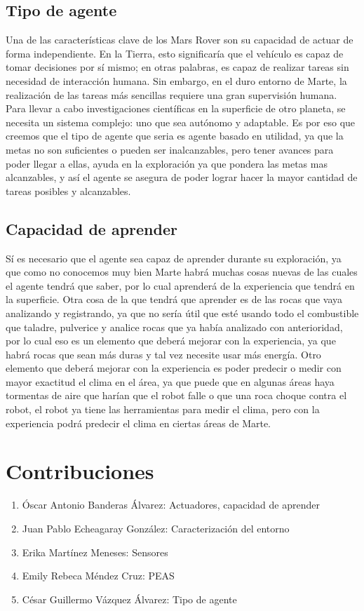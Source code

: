\documentclass{article}
\begin{document}
        \subsection{Tipo de agente}
            Una de las características clave de los Mars Rover son su capacidad de actuar de forma independiente. En la Tierra, esto significaría que el vehículo es capaz de tomar decisiones por sí mismo; en otras palabras, es capaz de realizar tareas sin necesidad de interacción humana. Sin embargo, en el duro entorno de Marte, la realización de las tareas más sencillas requiere una gran supervisión humana. Para llevar a cabo investigaciones científicas en la superficie de otro planeta, se necesita un sistema complejo: uno que sea autónomo y adaptable. Es por eso que creemos que el tipo de agente que seria es agente basado en utilidad, ya que la metas no son suficientes o pueden ser inalcanzables, pero tener avances para poder llegar a ellas, ayuda en la exploración ya que pondera las metas mas alcanzables, y así el agente se asegura de poder lograr hacer la mayor cantidad de tareas posibles y alcanzables.

        \subsection{Capacidad de aprender}
            Sí es necesario que el agente sea capaz de aprender durante su exploración, ya que como no conocemos muy bien Marte habrá muchas cosas nuevas de las cuales el agente tendrá que saber, por lo cual aprenderá de la experiencia que tendrá en la superficie. Otra cosa de la que tendrá que aprender es de las rocas que vaya analizando y registrando, ya que no sería útil que esté usando todo el combustible que taladre, pulverice y analice rocas que ya había analizado con anterioridad, por lo cual eso es un elemento que deberá mejorar con la experiencia, ya que habrá rocas que sean más duras y tal vez necesite usar más energía. Otro elemento que deberá mejorar con la experiencia es poder predecir o medir con mayor exactitud el clima en el área, ya que puede que en algunas áreas haya tormentas de aire que harían que el robot falle o que una roca choque contra el robot, el robot ya tiene las herramientas para medir el clima, pero con la experiencia podrá predecir el clima en ciertas áreas de Marte. 
    \section{Contribuciones}
        \begin{enumerate}
            \item Óscar Antonio Banderas Álvarez: Actuadores, capacidad de aprender
            \item Juan Pablo Echeagaray González: Caracterización del entorno
            \item Erika Martínez Meneses: Sensores
            \item Emily Rebeca Méndez Cruz: PEAS
            \item César Guillermo Vázquez Álvarez: Tipo de agente
        \end{enumerate}
\end{document}

